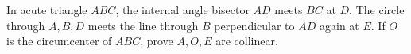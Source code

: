 In acute triangle $ABC$, the internal angle bisector $AD$ meets $BC$ at $D$. The circle through $A,B,D$ meets the line through $B$ perpendicular to $AD$ again at $E$. If $O$ is the circumcenter of $ABC$, prove $A,O,E$ are collinear.
